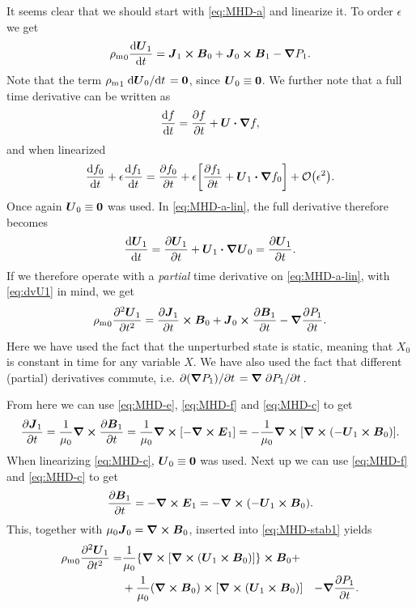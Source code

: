 \documentclass[11pt,a4paper, 
swedish, english %
]{article}
\newcommand{\rhom}{\ensuremath{{\rho_{\text{m}}}}}
\begin{document}
It seems clear that we should start with \eqref{eq:MHD-a} and
linearize it. To order $\epsilon$ we get
\begin{equation}\label{eq:MHD-a-lin}
\rhom_0\dv{\vb*U_1}{t} = 
\vb*J_1\cross\vb*B_0+\vb*J_0\cross\vb*B_1-\grad P_1.
\end{equation}
Note that the term $\rhom_1\dv*{\vb*U_0}{t}=\vb0$, since
$\vb*U_0\equiv\vb0$. We further note that a full time derivative can
be written as
\begin{equation}
\dv{f}{t}=\pdv{f}{t}+\vb*U\vdot\grad{f},
\end{equation}
and when linearized
\begin{equation}\label{eq:dv-lin}
\dv{f_0}{t}+\epsilon\dv{f_1}{t}=
\pdv{f_0}{t}
+\epsilon\qty[\pdv{f_1}{t}+\vb*U_1\vdot\grad{f_0}]
+\order{\epsilon^2}.
\end{equation}
Once again $\vb*U_0\equiv\vb0$ was used.
In \eqref{eq:MHD-a-lin}, the full derivative therefore becomes
\begin{equation}\label{eq:dvU1}
\dv{\vb*U_1}{t}=\pdv{\vb*U_1}{t}+\vb*U_1\vdot\grad\vb*U_0
=\pdv{\vb*U_1}{t}.
\end{equation}
If we therefore operate with a \emph{partial} time derivative on
\eqref{eq:MHD-a-lin}, with \eqref{eq:dvU1} in mind, we get
\begin{equation}\label{eq:MHD-stab1}
\rhom_0\pdv[2]{\vb*U_1}{t} = 
\pdv{\vb*J_1}{t}\cross\vb*B_0
+\vb*J_0\cross\pdv{\vb*B_1}{t}-\grad \pdv{P_1}{t}.
\end{equation}
Here we have used the fact that the unperturbed state is static,
meaning that $X_0$ is constant in time for any variable $X$. We have
also used the fact that different (partial) derivatives commute, i.e. 
$\pdv*{(\grad P_1)}{t}=\grad\pdv*{P_1}{t}$.

From here we can use \eqref{eq:MHD-e}, \eqref{eq:MHD-f} and
\eqref{eq:MHD-c} to get 
\begin{equation}
\pdv{\vb*J_1}{t}=\frac{1}{\mu_0}\curl\pdv{\vb*B_1}{t}
=\frac{1}{\mu_0}\curl\qty[-\curl\vb*E_1]
=-\frac{1}{\mu_0}\curl\qty[\curl\qty(-\vb*U_1\cross\vb*B_0)].
\end{equation}
When linearizing \eqref{eq:MHD-c}, $\vb*U_0\equiv\vb0$ was used. 
Next up we can use \eqref{eq:MHD-f} and \eqref{eq:MHD-c} to get
\begin{equation}
\pdv{\vb*B_1}{t}=-\curl\vb*E_1
=-\curl\qty(-\vb*U_1\cross\vb*B_0).
\end{equation}
This, together with $\mu_0\vb*J_0=\curl\vb*B_0$, inserted into
\eqref{eq:MHD-stab1} yields
\begin{equation}\label{eq:MHD-stab2}
\begin{aligned}
\rhom_0\pdv[2]{\vb*U_1}{t} =& 
\frac{1}{\mu_0}\qty{\curl\qty[\curl\qty(\vb*U_1\cross\vb*B_0)]}
\cross\vb*B_0+\\
&+\frac{1}{\mu_0}(\curl\vb*B_0)\cross
\qty[\curl\qty(\vb*U_1\cross\vb*B_0)]
&-\grad \pdv{P_1}{t}.
\end{aligned}
\end{equation}
\end{document}
